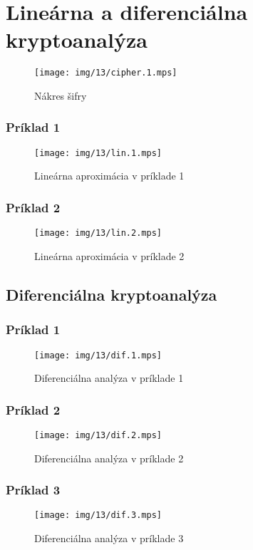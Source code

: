 \section{Lineárna a diferenciálna kryptoanalýza}

\begin{figure}[h!]
    \centering
    \texttt{[image: img/13/cipher.1.mps]}
    \caption{Nákres šifry}
\end{figure}



\subsubsection{Príklad 1}
\begin{figure}[h!]
    \centering
    \texttt{[image: img/13/lin.1.mps]}
    \caption{Lineárna aproximácia v príklade 1}
\end{figure}



\subsubsection{Príklad 2}
\begin{figure}[h!]
    \centering
    \texttt{[image: img/13/lin.2.mps]}
    \caption{Lineárna aproximácia v príklade 2}
\end{figure}



\subsection{Diferenciálna kryptoanalýza}


\subsubsection{Príklad 1}
\begin{figure}[h!]
    \centering
    \texttt{[image: img/13/dif.1.mps]}
    \caption{Diferenciálna analýza v príklade 1}
\end{figure}



\subsubsection{Príklad 2}
\begin{figure}[h!]
    \centering
    \texttt{[image: img/13/dif.2.mps]}
    \caption{Diferenciálna analýza v príklade 2}
\end{figure}



\subsubsection{Príklad 3}
\begin{figure}[h!]
    \centering
    \texttt{[image: img/13/dif.3.mps]}
    \caption{Diferenciálna analýza v príklade 3}
\end{figure}


